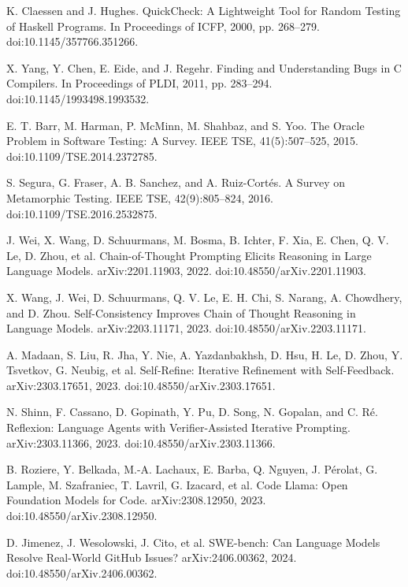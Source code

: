 \documentclass[10pt,twocolumn]{article}
\begin{document}
\small
\begin{thebibliography}{99}

K. Claessen and J. Hughes.
QuickCheck: A Lightweight Tool for Random Testing of Haskell Programs.
In Proceedings of ICFP, 2000, pp. 268--279. doi:10.1145/357766.351266.

X. Yang, Y. Chen, E. Eide, and J. Regehr.
Finding and Understanding Bugs in C Compilers.
In Proceedings of PLDI, 2011, pp. 283--294. doi:10.1145/1993498.1993532.

E. T. Barr, M. Harman, P. McMinn, M. Shahbaz, and S. Yoo.
The Oracle Problem in Software Testing: A Survey.
IEEE TSE, 41(5):507--525, 2015. doi:10.1109/TSE.2014.2372785.

S. Segura, G. Fraser, A. B. Sanchez, and A. Ruiz-Cort\'es.
A Survey on Metamorphic Testing.
IEEE TSE, 42(9):805--824, 2016. doi:10.1109/TSE.2016.2532875.

J. Wei, X. Wang, D. Schuurmans, M. Bosma, B. Ichter, F. Xia, E. Chen, Q. V. Le, D. Zhou, et al.
Chain-of-Thought Prompting Elicits Reasoning in Large Language Models.
arXiv:2201.11903, 2022. doi:10.48550/arXiv.2201.11903.

X. Wang, J. Wei, D. Schuurmans, Q. V. Le, E. H. Chi, S. Narang, A. Chowdhery, and D. Zhou.
Self-Consistency Improves Chain of Thought Reasoning in Language Models.
arXiv:2203.11171, 2023. doi:10.48550/arXiv.2203.11171.

A. Madaan, S. Liu, R. Jha, Y. Nie, A. Yazdanbakhsh, D. Hsu, H. Le, D. Zhou, Y. Tsvetkov, G. Neubig, et al.
Self-Refine: Iterative Refinement with Self-Feedback.
arXiv:2303.17651, 2023. doi:10.48550/arXiv.2303.17651.

N. Shinn, F. Cassano, D. Gopinath, Y. Pu, D. Song, N. Gopalan, and C. R\'e.
Reflexion: Language Agents with Verifier-Assisted Iterative Prompting.
arXiv:2303.11366, 2023. doi:10.48550/arXiv.2303.11366.

B. Roziere, Y. Belkada, M.-A. Lachaux, E. Barba, Q. Nguyen, J. P\'erolat, G. Lample, M. Szafraniec, T. Lavril, G. Izacard, et al.
Code Llama: Open Foundation Models for Code.
arXiv:2308.12950, 2023. doi:10.48550/arXiv.2308.12950.

D. Jimenez, J. Wesolowski, J. Cito, et al.
SWE-bench: Can Language Models Resolve Real-World GitHub Issues?
arXiv:2406.00362, 2024. doi:10.48550/arXiv.2406.00362.


\end{thebibliography}
\end{document}
